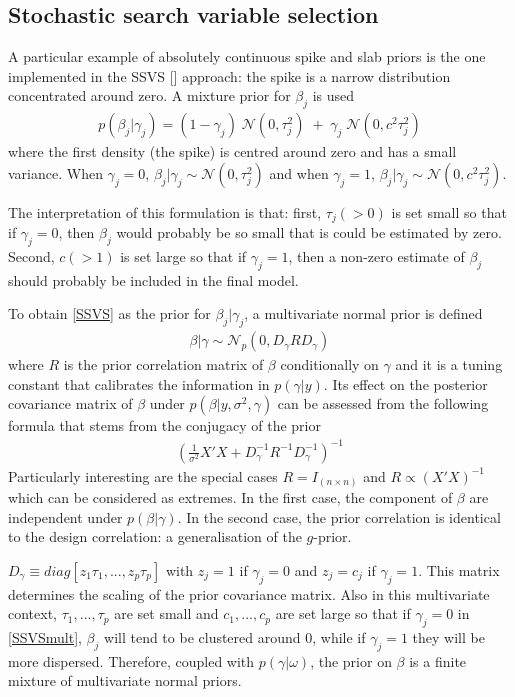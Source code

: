 \documentclass[11 pt]{article}
\begin{document}
\begin{multicols}{2}
\subsection{Stochastic search variable selection} 
A particular example of absolutely continuous spike and slab priors is the one implemented in the SSVS [\cite{George1997}] approach: the spike is a narrow distribution concentrated around zero. A mixture prior for $\beta_j$ is used
\begin{align}
    p(\beta_j | \gamma_j) = (1 - \gamma_j)\; \mathcal{N}(0, \tau^2_j) \;+\; \gamma_j\;\mathcal{N}(0, c^2\tau^2_j) \label{SSVS}
\end{align}
where the first density (the spike) is centred around zero and has a small variance. When $\gamma_j = 0$, $\beta_j|\gamma_j \sim \mathcal{N}(0, \tau^2_j)$ and when $\gamma_j = 1$, $\beta_j|\gamma_j \sim \mathcal{N}(0, c^2\tau^2_j)$.

The interpretation of this formulation is that: first, $\tau_j (>0)$ is set small so that if $\gamma_j = 0$, then $\beta_j$ would probably be so small that is could be estimated by zero. Second, $c (>1)$ is set large so that if $\gamma_j = 1$, then a non-zero estimate of $\beta_j$ should probably be included in the final model. 

To obtain \eqref{SSVS} as the prior for $\beta_j|\gamma_j$, a multivariate normal prior is defined
\begin{align}
    \beta|\gamma \sim \mathcal{N}_p (0, D_\gamma R D_\gamma) \label{SSVSmult}
\end{align}
where $R$ is the prior correlation matrix of $\beta$ conditionally on $\gamma$ and it is a tuning constant that calibrates the information in $p(\gamma|y)$. Its effect on the posterior covariance matrix of $\beta$ under $p(\beta|y, \sigma^2,\gamma)$ can be assessed from the following formula that stems from the conjugacy of the prior
\begin{align*}
    \left(\frac{1}{\sigma^2}X'X+D_\gamma^{-1}R^{-1}D_\gamma^{-1}\right)^{-1}
\end{align*}
Particularly interesting are the special cases $R=I_{(n \times n)}$ and $R\propto \left(X'X\right)^{-1}$ which can be considered as extremes. In the first case, the component of $\beta$ are independent under $p(\beta|\gamma)$. In the second case, the prior correlation is identical to the design correlation: a generalisation of the $g$-prior. 

$D_\gamma \equiv diag[z_1\tau_1,...,z_p\tau_p]$ with $z_j = 1$ if $\gamma_j = 0$ and $z_j = c_j$ if $\gamma_j = 1$. This matrix determines the scaling of the prior covariance matrix. Also in this multivariate context, $\tau_1,...,\tau_p$ are set small and $c_1,...,c_p$ are set large so that if $\gamma_j = 0$ in \eqref{SSVSmult}, $\beta_j$ will tend to be clustered around 0, while if $\gamma_j = 1$ they will be more dispersed. Therefore, coupled with $p(\gamma|\omega)$, the prior on $\beta$ is a finite mixture of multivariate normal priors.


\end{multicols}
\end{document}
